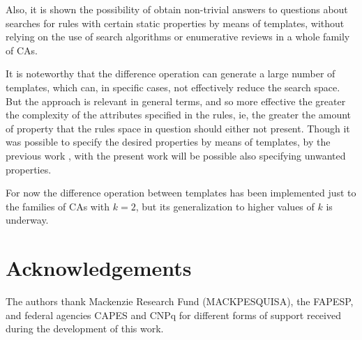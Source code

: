 \documentclass{llncs}
\begin{document}
Also, it is shown the possibility of obtain non-trivial answers to questions about searches for rules with certain static properties by means of templates, without relying on the use of search algorithms or enumerative reviews in a whole family of CAs.

It is noteworthy that the difference operation can generate a large number of templates, which can, in specific cases, not effectively reduce the search space. But the approach is relevant in general terms, and so more effective the greater the complexity of the attributes specified in the rules, ie, the greater the amount of property that the rules space in question should either not present. Though it was possible to specify the desired properties by means of templates, by the previous work \cite{deOliveira2014,deOliveira2014b}, with the present work will be possible also specifying unwanted properties.

For now the difference operation between templates has been implemented just to the families of CAs with $k=2$, but its generalization to higher values of $k$ is underway.

\section*{Acknowledgements}
\label{sec:agrdecimentos}
The authors thank Mackenzie Research Fund (MACKPESQUISA), the FAPESP, and federal agencies CAPES and CNPq for different forms of support received during the development of this work.
\end{document}
